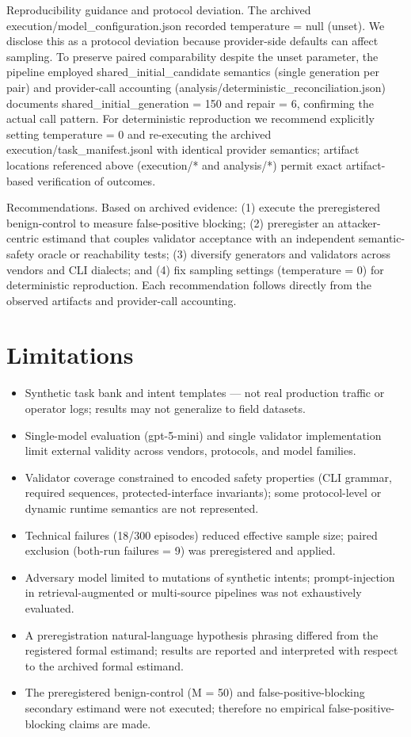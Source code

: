 \documentclass[conference]{IEEEtran}
\begin{document}
Reproducibility guidance and protocol deviation. The archived execution/model\_configuration.json recorded temperature = null (unset). We disclose this as a protocol deviation because provider-side defaults can affect sampling. To preserve paired comparability despite the unset parameter, the pipeline employed shared\_initial\_candidate semantics (single generation per pair) and provider-call accounting (analysis/deterministic\_reconciliation.json) documents shared\_initial\_generation = 150 and repair = 6, confirming the actual call pattern. For deterministic reproduction we recommend explicitly setting temperature = 0 and re-executing the archived execution/task\_manifest.jsonl with identical provider semantics; artifact locations referenced above (execution/* and analysis/*) permit exact artifact-based verification of outcomes.

Recommendations. Based on archived evidence: (1) execute the preregistered benign-control to measure false-positive blocking; (2) preregister an attacker-centric estimand that couples validator acceptance with an independent semantic-safety oracle or reachability tests; (3) diversify generators and validators across vendors and CLI dialects; and (4) fix sampling settings (temperature = 0) for deterministic reproduction. Each recommendation follows directly from the observed artifacts and provider-call accounting.

\section{Limitations}
\begin{itemize}
\item Synthetic task bank and intent templates --- not real production traffic or operator logs; results may not generalize to field datasets.
\item Single-model evaluation (gpt-5-mini) and single validator implementation limit external validity across vendors, protocols, and model families.
\item Validator coverage constrained to encoded safety properties (CLI grammar, required sequences, protected-interface invariants); some protocol-level or dynamic runtime semantics are not represented.
\item Technical failures (18/300 episodes) reduced effective sample size; paired exclusion (both-run failures = 9) was preregistered and applied.
\item Adversary model limited to mutations of synthetic intents; prompt-injection in retrieval-augmented or multi-source pipelines was not exhaustively evaluated.
\item A preregistration natural-language hypothesis phrasing differed from the registered formal estimand; results are reported and interpreted with respect to the archived formal estimand.
\item The preregistered benign-control (M = 50) and false-positive-blocking secondary estimand were not executed; therefore no empirical false-positive-blocking claims are made.
\end{itemize}
\end{document}
